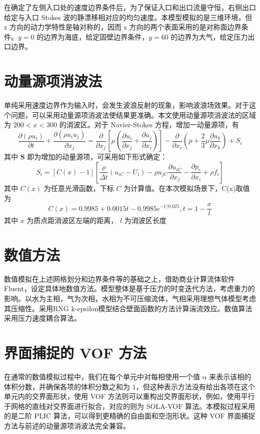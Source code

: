 在确定了左侧入口处的速度边界条件后，为了保证入口和出口流量守恒，右侧出口给定与入口 Stokes 波的静漂移相对应的均匀速度。本模型模拟的是三维环境，但 z 方向的动力学特性是轴对称的，因而 z 方向的两个表面采用的是对称面边界条件。$y = 0$ 的边界为海底，给定固壁边界条件，$y = 60$ 的边界为大气，给定压力出口边界。

\section{动量源项消波法}
单纯采用速度边界作为输入时，会发生波浪反射的现象，影响波浪场效果。对于这个问题，可以采用动量源项消波法使结果更准确\cite{Wang2005,Li2013,Peric2015}。本文使用动量源项消波法的区域为 $200 < x < 300$ 的消波区。对于 Navier-Stokes 方程，增加一动量源项，有
\begin{equation}
  \frac {\partial (\rho u_i)}{\partial t} + \frac {\partial (\rho u_i u_j)}{\partial x_j} = \frac {\partial}{\partial x_j} \left[ \mu \left( \frac {\partial u_i}{\partial x_j} + \frac {\partial u_j}{\partial x_i} \right) \right] - \frac {\partial}{\partial x_i} \left( p + \frac 2 3 \mu \frac {\partial u_k}{\partial x_k} \right) + S_i
\end{equation}
其中 $\mathbf S$ 即为增加的动量源项，可采用如下形式确定：
\begin{equation}
  S_i = [C(x) - 1]\left[ \frac \rho {\Delta t} (u_{iC} - U_i) - \rho u_{jC} \frac {\partial u_{iC}}{\partial x_j} - \frac {\partial p_c} {\partial x_i} + \rho f_i \right]
\end{equation}
其中 $C(x)$ 为任意光滑函数，下标 $C$ 为计算值。在本次模拟场景下，C(x)取值为
\begin{equation}
  C(x) = 0.9985 + 0.0015 t - 0.9985 e^{-t/0.025}, t = 1 - \frac x l
\end{equation}
其中 $x$ 为质点距消波区左端的距离， $l$ 为消波区长度

\section{数值方法}
数值模拟在上述网格划分和边界条件等的基础之上，借助商业计算流体软件 Fluent，设定具体地数值方法。模型整体是基于压力的时变迭代方法，考虑重力的影响。以水为主相，气为次相，水相为不可压缩流体，气相采用理想气体模型考虑其压缩性。采用RNG k-epsilon模型结合壁面函数的方法计算湍流效应。数值算法采用压力速度耦合算法。

\section{界面捕捉的 VOF 方法}
在通常的数值模拟过程中，我们在每个单元中对每相使用一个值 $\alpha$ 来表示该相的体积分数，并确保各项的体积分数之和为 $1$，但这种表示方法没有给出各项在这个单元内的交界面形状，使用 VOF 方法则可以重构出交界面形状\cite{HIRT1981}，例如，使用平行于网格的直线对交界面进行拟合，对应的则为 SOLA-VOF 算法。本模拟过程采用的是二阶 PLIC 算法，可以得到更精确的自由面和空泡形状。这种 VOF 界面捕捉方法与前述的动量源项消波法完全兼容\cite{Li2013}。

